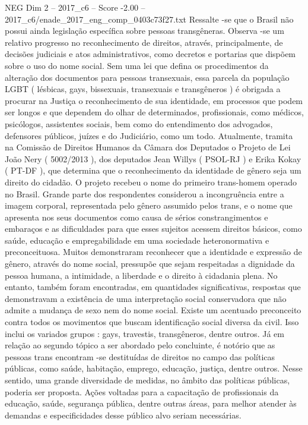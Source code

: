 \begin{textsample}{NEG Dim 2 – 2017\_c6 – Score -2.00 – 2017\_c6/enade\_2017\_eng\_comp\_0403c73f27.txt}
Ressalte -se que o Brasil não possui ainda legislação específica sobre pessoas transgêneras.
Observa -se um relativo progresso no reconhecimento de direitos, através, principalmente, de decisões judiciais e atos administrativos, como decretos e portarias que dispõem sobre o uso do nome social.
Sem uma lei que defina os procedimentos da alteração dos documentos para pessoas transexuais, essa parcela da população LGBT ( lésbicas, gays, bissexuais, transexuais e transgêneros ) é obrigada a procurar na Justiça o reconhecimento de sua identidade, em processos que podem ser longos e que dependem do olhar de determinados, profissionais, como médicos, psicólogos, assistentes sociais, bem como do entendimento dos advogados, defensores públicos, juízes e do Judiciário, como um todo.
Atualmente, tramita na Comissão de Direitos Humanos da Câmara dos Deputados o Projeto de Lei João Nery ( 5002/2013 ), dos deputados Jean Willys ( PSOL-RJ ) e Erika Kokay ( PT-DF ), que determina que o reconhecimento da identidade de gênero seja um direito do cidadão.
O projeto recebeu o nome do primeiro trans-homem operado no Brasil.
Grande parte dos respondentes considerou a incongruência entre a imagem corporal, representada pelo gênero assumido pelos trans, e o nome que apresenta nos seus documentos como causa de sérios constrangimentos e embaraços e as dificuldades para que esses sujeitos acessem direitos básicos, como saúde, educação e empregabilidade em uma sociedade heteronormativa e preconceituosa.
Muitos demonstraram reconhecer que a identidade e expressão de gênero, através do nome social, pressupõe que sejam respeitadas a dignidade da pessoa humana, a intimidade, a liberdade e o direito à cidadania plena.
No entanto, também foram encontradas, em quantidades significativas, respostas que demonstravam a existência de uma interpretação social conservadora que não admite a mudança de sexo nem do nome social.
Existe um acentuado preconceito contra todos os movimentos que buscam identificação social diversa da civil.
Isso inclui os variados grupos : gays, travestis, transgêneros, dentre outros.
Já em relação ao segundo tópico a ser abordado pelo concluinte, é notório que as pessoas trans encontram -se destituídas de direitos no campo das políticas públicas, como saúde, habitação, emprego, educação, justiça, dentre outros.
Nesse sentido, uma grande diversidade de medidas, no âmbito das políticas públicas, poderia ser proposta.
Ações voltadas para a capacitação de profissionais da educação, saúde, segurança pública, dentre outras áreas, para melhor atender às demandas e especificidades desse público alvo seriam necessárias.

\end{textsample}
